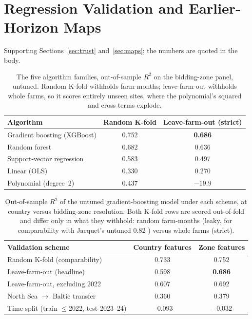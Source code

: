 \section{Regression Validation and Earlier-Horizon Maps}\label{app:reg_tables}

Supporting Sections~\ref{sec:trust} and~\ref{sec:maps}; the numbers are quoted
in the body.

\begin{table}[!htb]
\centering
\small
\caption{The five algorithm families, out-of-sample $R^2$ on the bidding-zone panel, untuned. Random K-fold withholds farm-months; leave-farm-out withholds whole farms, so it scores entirely unseen sites, where the polynomial's squared and cross terms explode.}
\label{tab:algorithms}
\begin{tabular}{l c c}
\toprule
\textbf{Algorithm} & \textbf{Random K-fold} & \textbf{Leave-farm-out (strict)} \\
\midrule
Gradient boosting (XGBoost) & 0.752 & \textbf{0.686} \\
Random forest & 0.682 & 0.636 \\
Support-vector regression & 0.583 & 0.497 \\
Linear (OLS) & 0.330 & 0.270 \\
Polynomial (degree~2) & 0.437 & $-19.9$ \\
\bottomrule
\end{tabular}
\end{table}

\begin{table}[!htb]
\centering
\small
\caption[Out-of-sample $R^2$ of the gradient-boosting model per scheme]{Out-of-sample $R^2$ of the untuned gradient-boosting model under each
scheme, at country versus bidding-zone resolution. Both K-fold rows are scored
out-of-fold and differ only in what they withhold: random farm-months (leaky,
for comparability with Jacquet's untuned 0.82 \cite{Jacquet2024}) versus whole farms
(strict).}
\label{tab:regression_metrics}
\begin{tabular}{l c c}
\toprule
\textbf{Validation scheme} & \textbf{Country features} & \textbf{Zone features} \\
\midrule
Random K-fold (comparability) & 0.733 & 0.752 \\
Leave-farm-out (headline) & 0.598 & \textbf{0.686} \\
Leave-farm-out, excluding 2022 & 0.607 & 0.692 \\
North Sea $\rightarrow$ Baltic transfer & 0.360 & 0.379 \\
Time split (train $\leq$2022, test 2023--24) & $-0.093$ & $-0.032$ \\
\bottomrule
\end{tabular}
\end{table}

